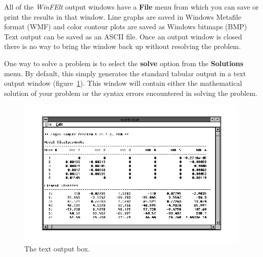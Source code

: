 All of the {\em WinFElt} output windows have a {\bf File} menu from
which you can save or print the results in that window.  
Line graphs are saved in Windows Metafile format (WMF) and
color contour plots are saved as Windows bitmaps (BMP)
Text output can be saved as an ASCII file.  Once an output window
is closed there is no way to bring the window back up without
resolving the problem.

One way to solve a problem is to select the {\bf solve} option from the
{\bf Solutions} menu.  By default, this simply generates the standard \felt{} 
tabular output in a text output window (figure~\ref{winfelt.output}). 
This window will contain either the mathematical solution of your problem 
or the syntax errors encountered in solving the problem.
%
\begin{figure}
\begin{center}
 \includegraphics[width=5in]{figures/winfelt_output}
\end{center}
\caption{The text output box.}
\label{winfelt.output}
\end{figure}

